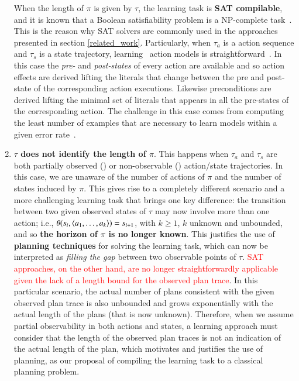 \begin{enumerate}
    When the length of $\pi$ is given by $\tau$, the learning task is \textbf{SAT compilable}, and it is known that a Boolean satisfiability problem is a NP-complete task~\cite{cook1971complexity}. This is the reason why SAT solvers are commonly used in the approaches presented in section \ref{related_work}. Particularly, when $\tau_a$ is a \FO action sequence and $\tau_s$ is a \FO state trajectory, learning \strips\ action models is straightforward~\cite{jimenez2012review}. In this case the {\em pre-} and {\em post-states} of every action are available and so action effects are derived lifting the literals that change between the pre and post-state of the corresponding action executions. Likewise preconditions are derived lifting the minimal set of literals that appears in all the pre-states of the corresponding action. The challenge in this case comes from computing the least number of examples that are necessary to learn models within a given error rate~\cite{SternJ17}.


\item \textbf{$\tau$ does not identify the length of $\pi$}. This happens when $\tau_a$ and $\tau_s$ are both partially observed (\PO) or non-observable (\NO) action/state trajectories. In this case, we are unaware of the number of actions of $\pi$ and the number of states induced by $\pi$. This gives rise to a completely different scenario and a more challenging learning task that brings one key difference: the transition between two given observed states of $\tau$ may now involve more than one action; i.e., $\theta(s_i,{\langle a_1,\ldots,a_k \rangle})=s_{i+1}$, with $k \geq 1$, $k$ unknown and unbounded, and so \textbf{the horizon of $\pi$ is no longer known}. This justifies the use of \textbf{planning techniques} for solving the learning task, which can now be interpreted as \emph{filling the gap} between two observable points of $\tau$. \textcolor{red}{SAT approaches, on the other hand, are no longer straightforwardly applicable given the lack of a length bound for the observed plan trace}. In this particular scenario, the actual number of plans consistent with the given observed plan trace is also unbounded and grows exponentially with the actual length of the plans (that is now unknown). Therefore, when we assume partial observability in both actions and states, a learning approach must consider that the length of the observed plan traces is not an indication of the actual length of the plan, which motivates and justifies the use of planning, as our proposal of compiling the learning task to a classical planning problem.


\end{enumerate}
